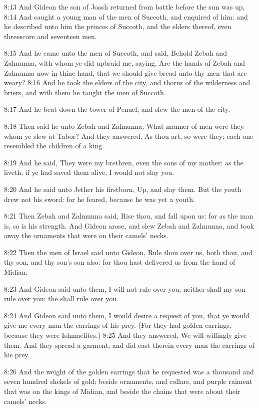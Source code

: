 8:13 And Gideon the son of Joash returned from battle before the sun was up, 8:14 And caught a young man of the men of Succoth, and enquired of him: and he described unto him the princes of Succoth, and the elders thereof, even threescore and seventeen men.

8:15 And he came unto the men of Succoth, and said, Behold Zebah and Zalmunna, with whom ye did upbraid me, saying, Are the hands of Zebah and Zalmunna now in thine hand, that we should give bread unto thy men that are weary?  8:16 And he took the elders of the city, and thorns of the wilderness and briers, and with them he taught the men of Succoth.

8:17 And he beat down the tower of Penuel, and slew the men of the city.

8:18 Then said he unto Zebah and Zalmunna, What manner of men were they whom ye slew at Tabor? And they answered, As thou art, so were they; each one resembled the children of a king.

8:19 And he said, They were my brethren, even the sons of my mother: as the \LORD liveth, if ye had saved them alive, I would not slay you.

8:20 And he said unto Jether his firstborn, Up, and slay them. But the youth drew not his sword: for he feared, because he was yet a youth.

8:21 Then Zebah and Zalmunna said, Rise thou, and fall upon us: for as the man is, so is his strength. And Gideon arose, and slew Zebah and Zalmunna, and took away the ornaments that were on their camels' necks.

8:22 Then the men of Israel said unto Gideon, Rule thou over us, both thou, and thy son, and thy son's son also: for thou hast delivered us from the hand of Midian.

8:23 And Gideon said unto them, I will not rule over you, neither shall my son rule over you: the \LORD shall rule over you.

8:24 And Gideon said unto them, I would desire a request of you, that ye would give me every man the earrings of his prey. (For they had golden earrings, because they were Ishmaelites.)  8:25 And they answered, We will willingly give them. And they spread a garment, and did cast therein every man the earrings of his prey.

8:26 And the weight of the golden earrings that he requested was a thousand and seven hundred shekels of gold; beside ornaments, and collars, and purple raiment that was on the kings of Midian, and beside the chains that were about their camels' necks.

